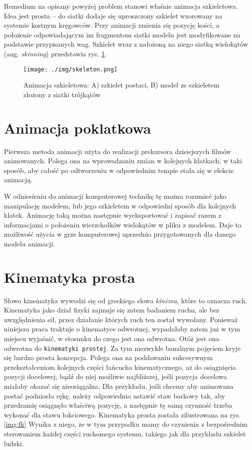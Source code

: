 \documentclass[11pt]{mwrep}
\begin{document}
Remedium na opisany powyżej problem stanowi właśnie animacja szkieletowa. Idea jest prosta -- do siatki dodaje się uproszczony szkielet wzorowany na systemie kostnym kręgowców. Przy animacji zmienia się pozycję kości, a położenie odpowiadającym im fragmentom siatki modelu jest modyfikowane na podstawie przypisanych wag. Szkielet wraz z nałożoną na niego siatką wielokątów (ang. \textit{skinning}) przedstawia rys. \ref{img:skeleton}.
    \begin{figure}
  \centering
    \texttt{[image: ./img/skeleton.png]}
  \caption{Animacja szkieletowa: A) szkielet postaci, B) model ze szkieletem złożony z siatki trójkątów}
  \label{img:skeleton}
  \end{figure}

  \section{Animacja poklatkowa}
  
Pierwsza metoda animacji użyta do realizacji prekursora dzisiejszych filmów animowanych. Polega ona na wprowadzaniu zmian w kolejnych klatkach, w taki sposób, aby całość po odtworzeniu w odpowiednim tempie stała się w efekcie animacją.

W odniesieniu do animacji komputerowej technikę tę można rozumieć jako manipulację modelem, lub jego szkieletem w odpowiedni sposób dla kolejnych klatek. Animację taką można następnie wyeksportować i zapisać razem z informacjami o położeniu wierzchołków wielokątów w pliku z modelem. Daje to możliwość użycia w grze komputerowej uprzednio przygotowanych dla danego modelu animacji.

  \section{Kinematyka prosta}

  Słowo kinematyka wywodzi się od greckiego słowa \textit{kín\={e}ma}, które to oznacza ruch. Kinematyka jako dział fizyki zajmuje się zatem badaniem ruchu, ale bez uwzględnienia sił, przez działanie których ruch ten został wywołany. Ponieważ niniejsza praca traktuje o kinematyce odwrotnej, wypadałoby zatem już w tym miejscu wyjaśnić, w stosunku do czego jest ona odwrotna. Otóż jest ona odwrotna do \texttt{kinematyki prostej}. Za tym niezwykle banalnym pojęciem kryje się bardzo prosta koncepcja. Polega ona na poddawaniu sukcesywnym przekształceniom kolejnych części łańcucha kinematycznego, aż do osiągnięcia pozycji docelowej, bądź do niej możliwie najbliższej, jeśli pozycja docelowa miałaby okazać się nieosiągalna. Dla przykładu, jeśli chcemy aby animowana postać podniosła rękę, należy odpowiednio ustawić staw barkowy tak, aby przedramię osiągnęło właściwą pozycję, a następnie tę samą czynność trzeba wykonać dla stawu łokciowego. Kinematyka prosta została zilustrowana na rys. \ref{img:fk} Wynika z niego, że w tym przypadku mamy do czynienia z bezpośrednim sterowaniem każdej części ruchomego systemu, takiego jak dla przykładu szkielet ludzki.
\end{document}
